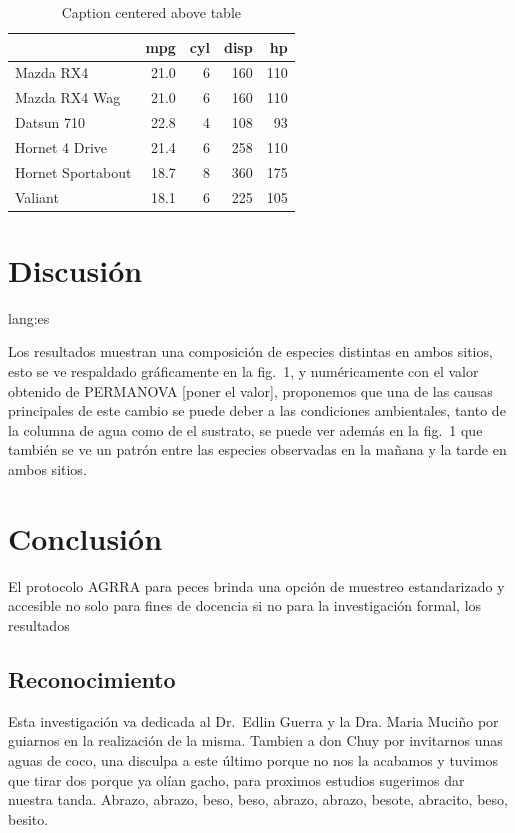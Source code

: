 \documentclass[
  authoryear,
  preprint,
  3p]{elsarticle}
\begin{document}
\begin{longtable}[]{@{}lrrrr@{}}

\caption{\label{tbl-simple}Caption centered above table}

\tabularnewline

\toprule\noalign{}
& mpg & cyl & disp & hp \\
\midrule\noalign{}
\endhead
\bottomrule\noalign{}
\endlastfoot
Mazda RX4 & 21.0 & 6 & 160 & 110 \\
Mazda RX4 Wag & 21.0 & 6 & 160 & 110 \\
Datsun 710 & 22.8 & 4 & 108 & 93 \\
Hornet 4 Drive & 21.4 & 6 & 258 & 110 \\
Hornet Sportabout & 18.7 & 8 & 360 & 175 \\
Valiant & 18.1 & 6 & 225 & 105 \\

\end{longtable}

\section*{Discusión}\label{discusiuxf3n}

lang:es

Los resultados muestran una composición de especies distintas en ambos
sitios, esto se ve respaldado gráficamente en la fig.~1, y numéricamente
con el valor obtenido de PERMANOVA {[}poner el valor{]}, proponemos que
una de las causas principales de este cambio se puede deber a las
condiciones ambientales, tanto de la columna de agua como de el
sustrato, se puede ver además en la fig.~1 que también se ve un patrón
entre las especies observadas en la mañana y la tarde en ambos sitios.

\section*{Conclusión}\label{conclusiuxf3n}

El protocolo AGRRA para peces brinda una opción de muestreo
estandarizado y accesible no solo para fines de docencia si no para la
investigación formal, los resultados

\subsection{Reconocimiento}\label{reconocimiento}

Esta investigación va dedicada al Dr.~Edlin Guerra y la Dra. Maria
Muciño por guiarnos en la realización de la misma. Tambien a don Chuy
por invitarnos unas aguas de coco, una disculpa a este último porque no
nos la acabamos y tuvimos que tirar dos porque ya olían gacho, para
proximos estudios sugerimos dar nuestra tanda. Abrazo, abrazo, beso,
beso, abrazo, abrazo, besote, abracito, beso, besito.


\renewcommand\refname{References}
  
\end{document}
